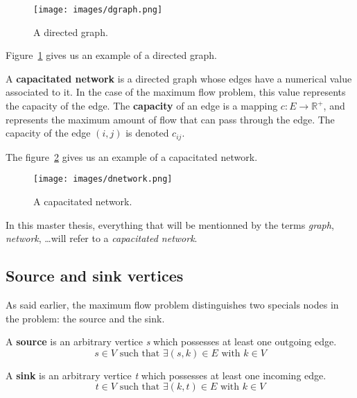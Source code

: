 \begin{figure}
\centering
\texttt{[image: images/dgraph.png]}
\caption{A directed graph.}
\label{img:dgraph}
\end{figure}

Figure~\ref{img:dgraph} gives us an example of a directed graph.

\begin{definition}
\label{dnetwork}
A \textbf{capacitated network} is a directed graph whose edges have a numerical value associated to it. In the case of the maximum flow problem, this value represents the capacity of the edge. The \textbf{capacity} of an edge is a mapping $c: E \to \mathbb{R}^{+}$, and represents the maximum amount of flow that can pass through the edge. The capacity of the edge $(i, j)$ is denoted $c_{ij}$.
\end{definition}

The figure~\ref{img:dnetwork} gives us an example of a capacitated network. \\

\begin{figure}
\centering
\texttt{[image: images/dnetwork.png]}
\caption{A capacitated network.}
\label{img:dnetwork}
\end{figure}



In this master thesis, everything that will be mentionned by the terms \textit{graph}, \textit{network}, \dots will refer to a \textit{capacitated network}.

\subsection{Source and sink vertices}
As said earlier, the maximum flow problem distinguishes two specials nodes in the problem: the source and the sink.

\begin{definition}
\label{source}
A \textbf{source} is an arbitrary vertice \textit{s} which possesses at least one outgoing edge.
$$s \in V \text{ such that } \exists (s, k) \in E \text{ with } k \in V$$
\end{definition}

\begin{definition}
\label{sink}
A \textbf{sink} is an arbitrary vertice \textit{t} which possesses at least one incoming edge. 
$$t \in V \text{ such that } \exists (k, t) \in E \text{ with } k \in V$$
\end{definition}

